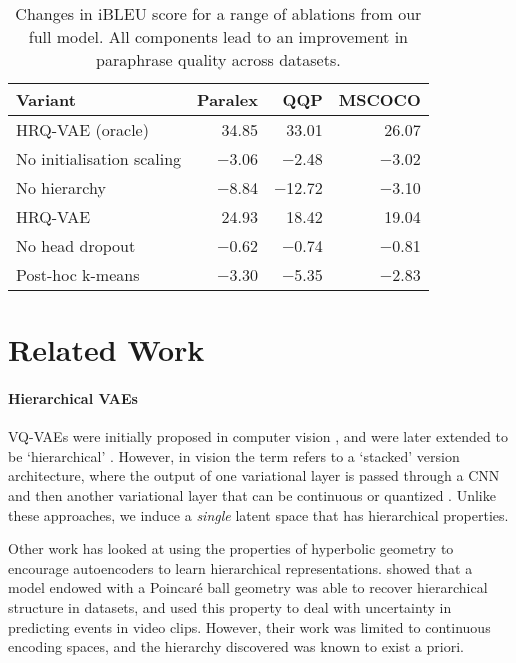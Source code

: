\documentclass[11pt]{article}
\begin{document}
\begin{table}[t!]
    \centering
\small
\begin{tabular}{l@{~}|r@{~}|r@{~}|r@{}}
\textbf{Variant} & {\textbf{Paralex}} & {\textbf{QQP}} & {\textbf{MSCOCO}} \\
\hline \hline
    HRQ-VAE (oracle) & 34.85 & 33.01 & 26.07  \\
    \hline
    No initialisation scaling & $-$3.06 & $-$2.48 & $-$3.02 \\
No hierarchy & $-$8.84 & $-$12.72 & $-$3.10 \\
\hline \hline
    HRQ-VAE & 24.93 & 18.42 & 19.04  \\
    \hline 
    No head dropout & $-$0.62 & $-$0.74 & $-$0.81 \\


    Post-hoc k-means & $-$3.30 & $-$5.35 & $-$2.83 \\
    \hline \hline
    \end{tabular}
\caption{Changes in iBLEU score for a range of ablations from our
      full model. All components lead to an improvement in paraphrase
      quality across datasets.} 
\label{tab:ablations}
\end{table}




\section{Related Work}



\paragraph{Hierarchical VAEs}

VQ-VAEs were initially proposed in computer vision \cite{vqvae}, and were later extended to be `hierarchical' \cite{vqvae2}. However, in vision the term refers to a `stacked' version architecture, where the output of one variational layer is passed through a CNN and then another variational layer that can be continuous \cite{vahdat2020NVAE} or quantized \cite{hqa,Livin2019TowardsHD,willetts2021relaxedresponsibility}. Unlike these approaches, we induce a \emph{single} latent space that has hierarchical properties. 

Other work has looked at using the properties of hyperbolic geometry to encourage autoencoders to learn hierarchical representations. \citet{mathieu2019poincare} showed that a model endowed with a Poincaré ball geometry was able to recover hierarchical structure in datasets, and \citet{suris2021hyperfuture} used this property to deal with uncertainty in predicting events in video clips. However, their work was limited to continuous encoding spaces, and the hierarchy discovered was known to exist a priori. 
\end{document}
